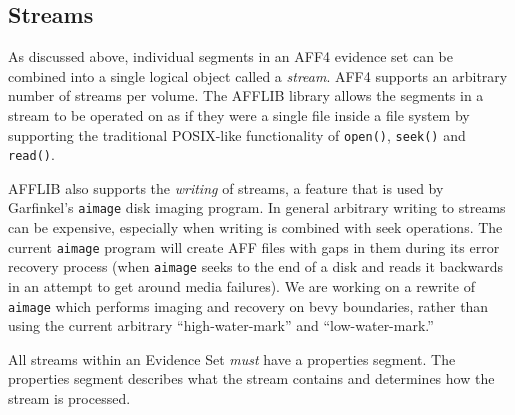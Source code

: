 \documentclass[10pt, conference]{IEEEtran}
\begin{document}




\subsection{Streams}
As discussed above, individual segments in an AFF4 evidence set can be
combined into a single logical object called a \emph{stream}. AFF4
supports an arbitrary number of streams per volume. The AFFLIB library
allows the segments in a stream to be operated on as if they were a
single file inside a file system by supporting the traditional
POSIX-like functionality of \texttt{open()}, \texttt{seek()} and
\texttt{read()}.

AFFLIB also supports the \emph{writing} of streams, a feature that is
used by Garfinkel's \texttt{aimage} disk imaging program. In general
arbitrary writing to streams can be expensive, especially when writing
is combined with seek operations. The current \texttt{aimage} program
will create AFF files with gaps in them during its error recovery
process (when \texttt{aimage} seeks to the end of a disk and reads it
backwards in an attempt to get around media failures). We are working
on a rewrite of \texttt{aimage} which performs imaging and recovery
on bevy boundaries, rather than using the current arbitrary
``high-water-mark'' and ``low-water-mark.''

All streams within an Evidence Set \emph{must} have a properties segment. The
properties segment describes what the stream contains and determines
how the stream is processed. 
\end{document}
